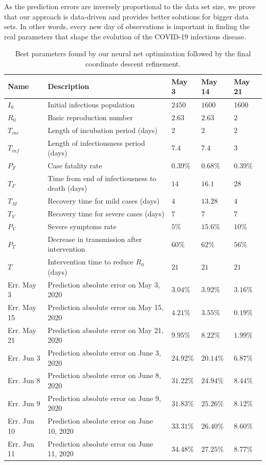 \documentclass[11pt]{article}
\begin{document}
As the prediction errors are inversely proportional to the data set size, we prove that our approach is data-driven and provides better solutions for bigger data sets. In other words, every new day of observations is important in finding the real parameters that shape the evolution of the COVID-19 infectious disease.

\newpage

\begin{table}[H]
  \caption{Best parameters found by our neural net optimization followed by the final coordinate descent refinement.}
  \label{table:data-dependency-params}
  \centering
  \begin{tabular}{lllll}
    \toprule
    Name & Description & May 3 & May 14 & May 21 \\
    \midrule
    $I_0$ & Initial infectious population & $2450$ & $1600$ & $1600$\\
    $R_0$ & Basic reproduction number & $2.63$ & $2.63$ & $2$\\
    $T_{inc}$ & Length of incubation period (days) & $2$ & $2$ & $2$\\
    $T_{inf}$ & Length of infectiousness period (days) & $7.4$ & $7.4$ & $3$\\
    $P_F$ & Case fatality rate & $0.39\%$ & $0.68\%$ & $0.39\%$\\
    $T_F$ & Time from end of infectiousness to death (days) & $14$ & $16.1$ & $28$\\
    $T_M$ & Recovery time for mild cases (days) & $4$ & $13.28$ & $4$\\
    $T_V$ & Recovery time for severe cases (days) & $7$ & $7$ & $7$\\
    $P_V$ & Severe symptoms rate & $5\%$ & $15.6\%$ & $10\%$\\
    $P_T$ & Decrease in transmission after intervention & $60\%$ & $62\%$ & $56\%$\\
    $T$ & Intervention time to reduce $R_0$ (days)  & $21$ & $21$ & $21$\\
    \midrule
    Err. May 3 & Prediction absolute error on May 3, 2020 & $3.04\%$ & $3.92\%$ & $3.16\%$ \\
    Err. May 15 & Prediction absolute error on May 15, 2020 & $4.21\%$ & $3.55\%$ & $0.19\%$ \\
    Err. May 21 & Prediction absolute error on May 21, 2020 & $9.95\%$ & $8.22\%$ & $1.99\%$ \\
    Err. Jun 3 & Prediction absolute error on June 3, 2020 & $24.92\%$ & $20.14\%$ & $6.87\%$ \\
    Err. Jun 8 & Prediction absolute error on June 8, 2020 & $31.22\%$ & $24.94\%$ & $8.44\%$ \\
    Err. Jun 9 & Prediction absolute error on June 9, 2020 & $31.83\%$ & $25.26\%$ & $8.12\%$ \\
    Err. Jun 10 & Prediction absolute error on June 10, 2020 & $33.31\%$ & $26.40\%$ & $8.60\%$ \\
    Err. Jun 11 & Prediction absolute error on June 11, 2020 & $34.48\%$ & $27.25\%$ & $8.77\%$ \\
    \bottomrule
  \end{tabular}
\end{table}
\end{document}
